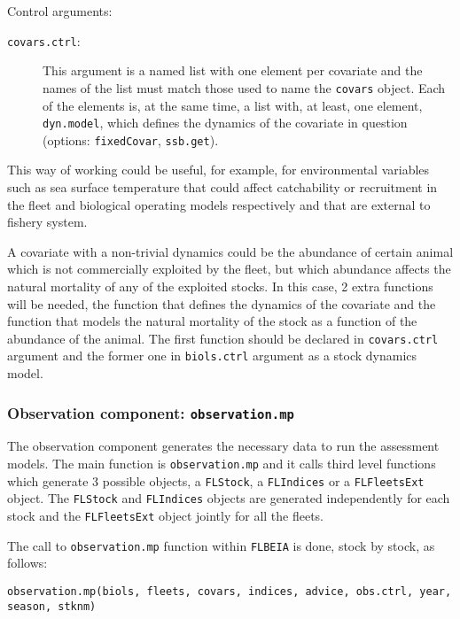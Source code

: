 \noindent Control arguments:
\begin{description}
  \item[\texttt{covars.ctrl}:] This argument is a named list with one element per covariate and the names of the list must match those used 
  to name the \texttt{covars} object. Each of the elements is, at the same time, a list with, at least, one element, \texttt{dyn.model}, 
	which defines the dynamics of the covariate in question (options: \texttt{fixedCovar}, \texttt{ssb.get}).
\end{description}

	This way of working could be useful, for example, for environmental variables such as 
	sea surface temperature that could affect catchability or recruitment in the fleet and 
	biological operating models respectively and that are external to fishery system. 
	
	A covariate with a non-trivial 
	dynamics could be the abundance of certain animal which is not commercially exploited by the fleet, but which abundance
	affects the natural mortality of any of the exploited stocks. In this case, 2 extra functions will be needed, the function
	that defines the dynamics of the covariate and the function that models the natural mortality of the stock as a function of the abundance
	of the animal. The first function should be declared in \texttt{covars.ctrl} argument and the former one in 
	\texttt{biols.ctrl} argument as a stock dynamics model. 
 
	
	\subsubsection{Observation component: \texttt{observation.mp}}
	
	The observation component generates the necessary data to run the assessment models.
	The main function is \texttt{observation.mp} and it calls third level functions 
	which generate 3 possible objects, a \texttt{FLStock}, a \texttt{FLIndices} or a 
	\texttt{FLFleetsExt} object. The \texttt{FLStock} and  \texttt{FLIndices} objects
	are generated independently for each stock and the \texttt{FLFleetsExt} object
	jointly for all the fleets.
	
	\noindent The call to \texttt{observation.mp} function within \texttt{FLBEIA} is done, stock by stock, as follows:
	
  \begin{center}
  	\texttt{observation.mp(biols, fleets, covars, indices, advice, obs.ctrl, year, season, stknm) }
  \end{center}

